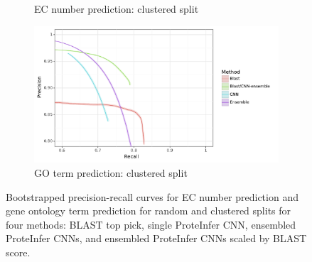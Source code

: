 \begin{figure}[ht]
\begin{subfigure}[b]{0.5\linewidth}
    \caption{EC number prediction: clustered split} 
    \label{fig:with_ensemble:c} 
  \end{subfigure}%
  \begin{subfigure}[b]{0.5\linewidth}
    \centering
    \includegraphics[width=1\linewidth]{Figures/clustered_truncated_go.pdf}
    \caption{GO term prediction: clustered split} 
    \label{fig:with_ensemble:d} 
  \end{subfigure} 
  \caption{Bootstrapped precision-recall curves for EC number prediction and gene ontology term prediction for random and clustered splits for four methods: BLAST top pick, single ProteInfer CNN, ensembled ProteInfer CNNs, and ensembled ProteInfer CNNs scaled by BLAST score. }
  \label{fig:with_ensemble} 
\end{figure}



